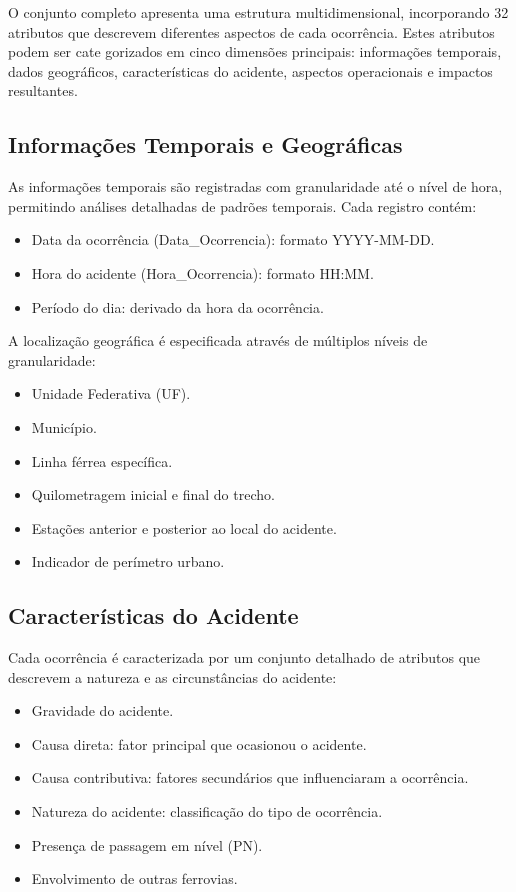 \documentclass[conference]{IEEEtran}
\begin{document}
O conjunto completo apresenta uma estrutura multidimensional, incorporando 32 atributos que descrevem diferentes aspectos de cada ocorrência. Estes atributos podem ser cate gorizados em cinco dimensões principais: informações temporais, dados geográficos, características do acidente, aspectos operacionais e impactos resultantes.

\subsection{Informações Temporais e Geográficas}
As informações temporais são registradas com granularidade até o nível de hora, permitindo análises detalhadas de padrões temporais. Cada registro contém:

\begin{itemize}
\item Data da ocorrência (Data\_Ocorrencia): formato YYYY-MM-DD.
\item Hora do acidente (Hora\_Ocorrencia): formato HH:MM.
\item Período do dia: derivado da hora da ocorrência.
\end{itemize}

A localização geográfica é especificada através de múltiplos níveis de granularidade:
\begin{itemize}
\item Unidade Federativa (UF).
\item Município.
\item Linha férrea específica.
\item Quilometragem inicial e final do trecho.
\item Estações anterior e posterior ao local do acidente.
\item Indicador de perímetro urbano.
\end{itemize}

\subsection{Características do Acidente}
Cada ocorrência é caracterizada por um conjunto detalhado de atributos que descrevem a natureza e as circunstâncias do acidente:

\begin{itemize}
\item Gravidade do acidente.
\item Causa direta: fator principal que ocasionou o acidente.
\item Causa contributiva: fatores secundários que influenciaram a ocorrência.
\item Natureza do acidente: classificação do tipo de ocorrência.
\item Presença de passagem em nível (PN).
\item Envolvimento de outras ferrovias.
\end{itemize}
\end{document}
